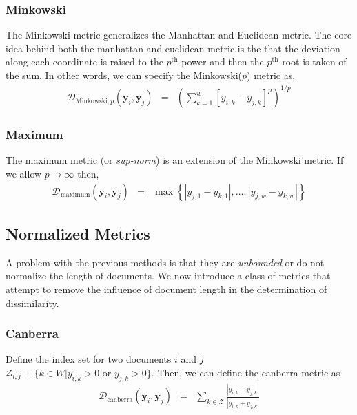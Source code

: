 \documentclass[11pt,letterpaper]{article}
\numberwithin{equation}{section}
\begin{document}
\subsubsection{Minkowski}
The Minkowski metric generalizes the Manhattan and Euclidean metric.
The core idea behind both the manhattan and euclidean metric is the
that the deviation along each coordinate is raised to the
$p^{\text{th}}$ power and then the $p^{\text{th}}$ root is taken of
the sum.  In other words, we can specify the Minkowski($p$) metric
as,
\begin{eqnarray}
\mathcal{D}_{\text{Minkowski}, p }(\boldsymbol{y}_i,\boldsymbol{y}_j
) & = & \left( \sum_{k=1}^{w} \left[y_{i,k} - y_{j,k} \right]^{p}
\right)^{1/p} \nonumber
\end{eqnarray}
\subsubsection{Maximum}
The maximum metric (or \emph{sup-norm}) is an extension of the
Minkowski metric.  If we allow $p \rightarrow \infty$ then,
\begin{eqnarray}
\mathcal{D}_{\text{maximum}}(\boldsymbol{y}_i,\boldsymbol{y}_j ) & =
& \max \left\{|y_{j,1} - y_{k,1} |, \hdots, |y_{j,w} - y_{k,w} |
\right\} \nonumber
\end{eqnarray}
\subsection{Normalized Metrics}
A problem with the previous methods is that they are
\emph{unbounded} or do not normalize the length of documents.  We
now introduce a class of metrics that attempt to remove the
influence of document length in the determination of dissimilarity.
\subsubsection{Canberra}
Define the index set for two documents $i$ and $j$
$\mathcal{Z}_{i,j}  \equiv \{k \in W | y_{i,k} > 0 \text{ or }
y_{j,k} > 0 \}.$  Then, we can define the canberra metric as
\begin{eqnarray}
\mathcal{D}_{\text{canberra}}(\boldsymbol{y}_i,\boldsymbol{y}_j ) &
= & \sum_{k \in \mathcal{Z}} \frac{|y_{i,k} - y_{j,k} | }{|y_{i,k} +
y_{j,k}  | } \nonumber
\end{eqnarray}
\end{document}
